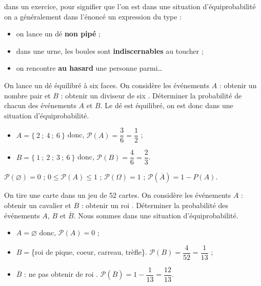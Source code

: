 \begin{remarque}
   dans un exercice, pour signifier que l'on est dans une situation d'équiprobabilité on a généralement dans l'énoncé un expression du type :
   \begin{itemize}
      \item on lance un dé \textbf{non pipé} ;
      \item dans une urne, les boules sont \textbf{indiscernables} au toucher ;
      \item on rencontre \textbf{au hasard} une personne parmi\dots
   \end{itemize}
\end{remarque}

\begin{exemple}
   On lance un dé équilibré à six faces. On considère les événements $A$ : \og obtenir un nombre pair \fg{} et $B$ : \og obtenir un diviseur de six \fg{}. Déterminer la probabilité de chacun des événements $A$ et $B$.
\correction
   Le dé est équilibré, on est donc dans une situation d'équiprobabilité.
   \begin{itemize} 
      \item $A=\{~2~;~4~;~6~\}$ donc, $\mathcal{P}(A)=\dfrac{3}{6}=\dfrac{1}{2}$ ; \smallskip
      \item $B=\{~1~;~2~;~3~;~6~\}$ donc, $\mathcal{P}(B)=\dfrac{4}{6}=\dfrac{2}{3}$.
   \end{itemize}
\end{exemple}

\bigskip

\begin{propriete}
   $\mathcal{P}(\varnothing)=0$ ; \qquad $0 \leqslant \mathcal{P}(A) \leqslant 1$ ; \qquad $\mathcal{P}(\Omega)=1$ ; \qquad $\mathcal{P}(\overline{A})=1-P(A)$.
\end{propriete}

\bigskip

\begin{exemple}
   On tire une carte dans un jeu de 52 cartes. On considère les événements $A$ : \og obtenir un cavalier \fg{} et $B$ : \og obtenir un roi \fg{}. Déterminer la probabilité des événements $A$, $B$ et $\overline{B}$.
\correction
   Nous sommes dans une situation d'équiprobabilité.
\begin{itemize} 
   \item $A=\varnothing$ donc, $\mathcal{P}(A)=0$ ;
   \item $B=$\{roi de pique, coeur, carreau, trèfle\}. $\mathcal{P}(B)=\dfrac{4}{52} =\dfrac{1}{13}$ ; \smallskip
   \item  $\overline{B}$ : \og ne pas obtenir de roi \fg{}. $\mathcal{P}(\overline{B})=1-\dfrac{1}{13} =\dfrac{12}{13}$.
   \end{itemize}
\end{exemple}

